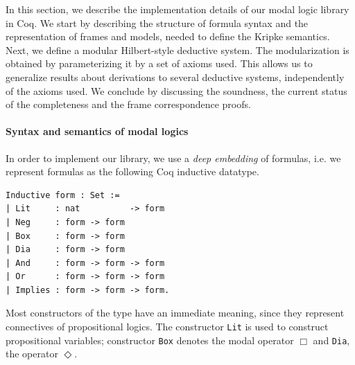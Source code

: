 \documentclass[sigconf]{acmart}
\begin{document}
In this section, we describe the implementation details of our modal logic
library in Coq. We start by describing the structure of formula syntax and the
representation of frames and models, needed to define the Kripke semantics.
Next, we define a modular Hilbert-style deductive system. The modularization is
obtained by parameterizing it by a set of axioms used. This allows us to
generalize results about derivations to several deductive systems, independently
of the axioms used. We conclude by discussing the soundness, the current
status of the completeness and the frame correspondence proofs.

\paragraph{Syntax and semantics of modal logics}
In order to implement our library, we use a \emph{deep embedding} of
formulas, i.e. we represent formulas as the following Coq inductive datatype.
\begin{verbatim}
Inductive form : Set :=
| Lit     : nat          -> form
| Neg     : form -> form
| Box     : form -> form
| Dia     : form -> form
| And     : form -> form -> form
| Or      : form -> form -> form
| Implies : form -> form -> form.
\end{verbatim}
Most constructors of the type have an immediate meaning, since they represent
connectives of propositional logics. The constructor \texttt{Lit}
is used to construct propositional variables; constructor \texttt{Box}
denotes the modal operator $\Box$ and \texttt{Dia}, the operator
$\Diamond$.
\end{document}
